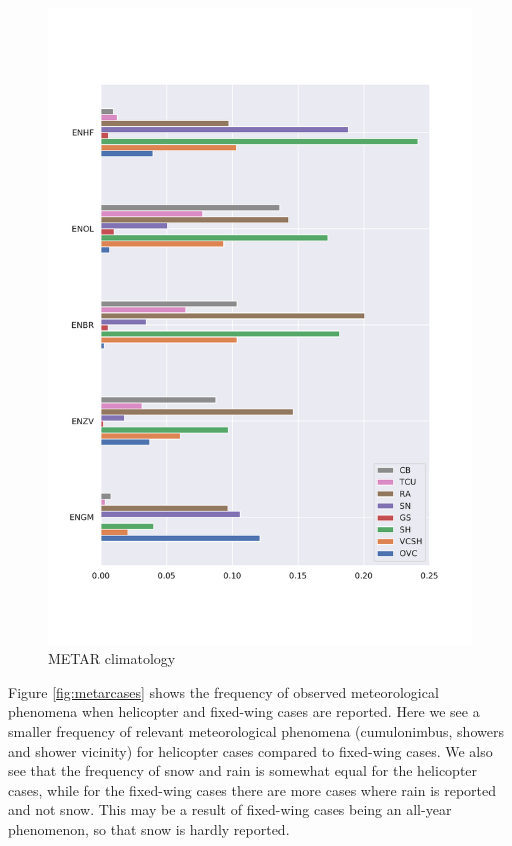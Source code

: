 \begin{figure}
    \centering
    \includegraphics[width=\textwidth]{Figures/METAR_airports.pdf}
    \caption{METAR climatology}
    \label{fig:metarclimat}
\end{figure}

Figure \ref{fig:metarcases} shows the frequency of observed meteorological phenomena when helicopter and fixed-wing cases are reported. Here we see a smaller frequency of relevant meteorological phenomena (cumulonimbus, showers and shower vicinity) for helicopter cases compared to fixed-wing cases. We also see that the frequency of snow and rain is somewhat equal for the helicopter cases, while for the fixed-wing cases there are more cases where rain is reported and not snow. This may be a result of fixed-wing cases being an all-year phenomenon, so that snow is hardly reported.


